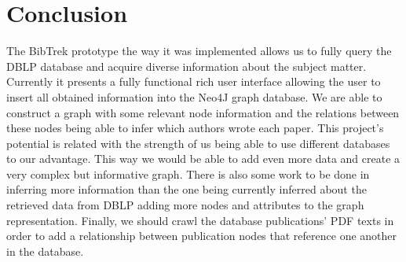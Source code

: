 \documentclass{article}
\begin{document}
\section{Conclusion}
The BibTrek prototype the way it was implemented allows us to fully query the DBLP database and acquire diverse information about the subject matter. Currently it presents a fully functional rich user interface allowing the user to insert all obtained information into the Neo4J graph database. We are able to construct a graph with some relevant node information and the relations between these nodes being able to infer which authors wrote each paper. This project's potential is related with the strength of us being able to use different databases to our advantage. This way we would be able to add even more data and create a very complex but informative graph. There is also some work to be done in inferring more information than the one being currently inferred about the retrieved data from DBLP adding more nodes and attributes to the graph representation. Finally, we should crawl the database publications' PDF texts in order to add a relationship between publication nodes that reference one another in the database.
\end{document}
